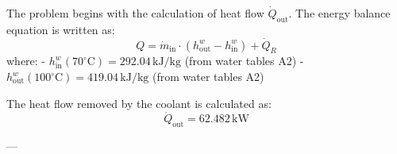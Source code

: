 The problem begins with the calculation of heat flow \( \dot{Q}_{\text{out}} \). The energy balance equation is written as:  
\[
Q = \dot{m}_{\text{in}} \cdot \left( h_{\text{out}}^{w} - h_{\text{in}}^{w} \right) + \dot{Q}_R
\]  
where:  
- \( h_{\text{in}}^{w}(70^\circ\text{C}) = 292.04 \, \text{kJ/kg} \) (from water tables A2)  
- \( h_{\text{out}}^{w}(100^\circ\text{C}) = 419.04 \, \text{kJ/kg} \) (from water tables A2)  

The heat flow removed by the coolant is calculated as:  
\[
\dot{Q}_{\text{out}} = 62.482 \, \text{kW}
\]  

---
